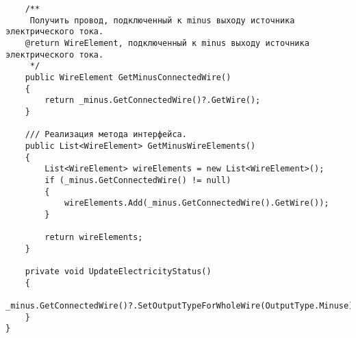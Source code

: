 \begin{verbatim}
    /**
     Получить провод, подключенный к minus выходу источника электрического тока.
    @return WireElement, подключенный к minus выходу источника электрического тока.
     */
    public WireElement GetMinusConnectedWire()
    {
        return _minus.GetConnectedWire()?.GetWire();
    }

    /// Реализация метода интерфейса.
    public List<WireElement> GetMinusWireElements()
    {
        List<WireElement> wireElements = new List<WireElement>();
        if (_minus.GetConnectedWire() != null)
        {
            wireElements.Add(_minus.GetConnectedWire().GetWire());
        }

        return wireElements;
    }

    private void UpdateElectricityStatus()
    {
        _minus.GetConnectedWire()?.SetOutputTypeForWholeWire(OutputType.Minuse);
    }
}

\end{verbatim}
